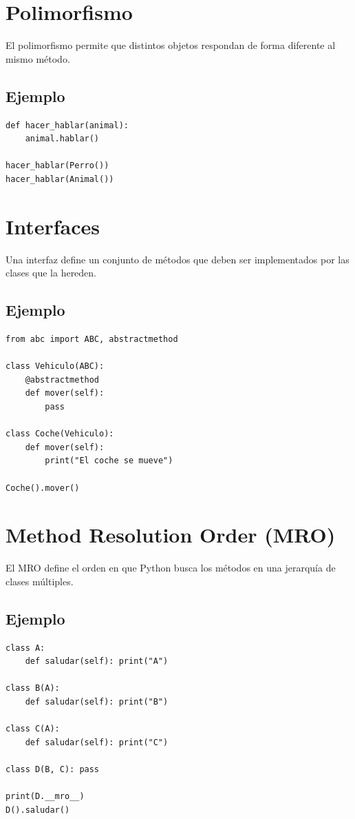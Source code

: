 \documentclass[12pt,a4paper]{article}
\begin{document}
\section{Polimorfismo}
El polimorfismo permite que distintos objetos respondan de forma diferente al mismo método.

\subsection{Ejemplo}
\begin{lstlisting}
def hacer_hablar(animal):
    animal.hablar()

hacer_hablar(Perro())
hacer_hablar(Animal())
\end{lstlisting}

\section{Interfaces}
Una interfaz define un conjunto de métodos que deben ser implementados por las clases que la hereden.

\subsection{Ejemplo}
\begin{lstlisting}
from abc import ABC, abstractmethod

class Vehiculo(ABC):
    @abstractmethod
    def mover(self):
        pass

class Coche(Vehiculo):
    def mover(self):
        print("El coche se mueve")

Coche().mover()
\end{lstlisting}

\section{Method Resolution Order (MRO)}
El MRO define el orden en que Python busca los métodos en una jerarquía de clases múltiples.

\subsection{Ejemplo}
\begin{lstlisting}
class A:
    def saludar(self): print("A")

class B(A):
    def saludar(self): print("B")

class C(A):
    def saludar(self): print("C")

class D(B, C): pass

print(D.__mro__)
D().saludar()
\end{lstlisting}
\end{document}
